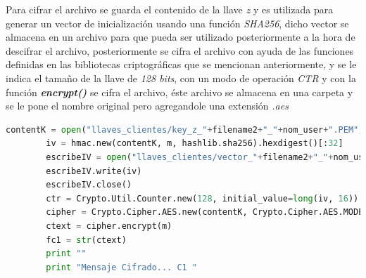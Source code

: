 Para cifrar el archivo se guarda el contenido de la llave \textit{z} y es utilizada para generar un vector de inicialización usando una función \textit{SHA256}, dicho vector se almacena en un archivo para que pueda ser utilizado posteriormente a la hora de descifrar el archivo, posteriormente se cifra el archivo con ayuda de las funciones definidas en las bibliotecas criptográficas que se mencionan anteriormente, y se le indica el tamaño de la llave de \textit{128 bits}, con un modo de operación \textit{CTR} y con la función \textbf{\textit{encrypt()}} se cifra el archivo, éste archivo se almacena en una carpeta y se le pone el nombre original pero agregandole una  extensión \textit{.aes}

\begin{lstlisting}[language=Python,frame=single, keywordstyle=\color{blue},breaklines=true, showstringspaces=false]
        contentK = open("llaves_clientes/key_z_"+filename2+"_"+nom_user+".PEM", "rb").read()
        iv = hmac.new(contentK, m, hashlib.sha256).hexdigest()[:32]  
        escribeIV = open("llaves_clientes/vector_"+filename2+"_"+nom_user+".txt","wb")
        escribeIV.write(iv)
        escribeIV.close()
        ctr = Crypto.Util.Counter.new(128, initial_value=long(iv, 16))
        cipher = Crypto.Cipher.AES.new(contentK, Crypto.Cipher.AES.MODE_CTR, counter=ctr)
        ctext = cipher.encrypt(m)
        fc1 = str(ctext)
        print ""
        print "Mensaje Cifrado... C1 "
\end{lstlisting}


